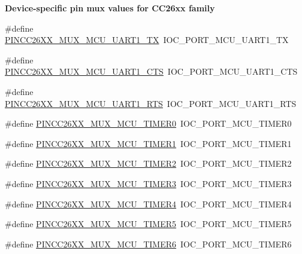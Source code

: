 \begin{Indent}{\bf Device-\/specific pin mux values for C\-C26xx family}
\begin{DoxyCompactItemize}
\item 
\#define \hyperlink{_p_i_n_c_c26_x_x_8h_a86f90a7c527db111500f481c32503c0e}{P\-I\-N\-C\-C26\-X\-X\-\_\-\-M\-U\-X\-\_\-\-M\-C\-U\-\_\-\-U\-A\-R\-T1\-\_\-\-T\-X}~I\-O\-C\-\_\-\-P\-O\-R\-T\-\_\-\-M\-C\-U\-\_\-\-U\-A\-R\-T1\-\_\-\-T\-X
\item 
\#define \hyperlink{_p_i_n_c_c26_x_x_8h_a7e579ca0aee2428813b15c97ba23d28b}{P\-I\-N\-C\-C26\-X\-X\-\_\-\-M\-U\-X\-\_\-\-M\-C\-U\-\_\-\-U\-A\-R\-T1\-\_\-\-C\-T\-S}~I\-O\-C\-\_\-\-P\-O\-R\-T\-\_\-\-M\-C\-U\-\_\-\-U\-A\-R\-T1\-\_\-\-C\-T\-S
\item 
\#define \hyperlink{_p_i_n_c_c26_x_x_8h_a19de716646ff8365a45a1111c5d41979}{P\-I\-N\-C\-C26\-X\-X\-\_\-\-M\-U\-X\-\_\-\-M\-C\-U\-\_\-\-U\-A\-R\-T1\-\_\-\-R\-T\-S}~I\-O\-C\-\_\-\-P\-O\-R\-T\-\_\-\-M\-C\-U\-\_\-\-U\-A\-R\-T1\-\_\-\-R\-T\-S
\item 
\#define \hyperlink{_p_i_n_c_c26_x_x_8h_ab6adbeb3876713207934393f6e3ea98b}{P\-I\-N\-C\-C26\-X\-X\-\_\-\-M\-U\-X\-\_\-\-M\-C\-U\-\_\-\-T\-I\-M\-E\-R0}~I\-O\-C\-\_\-\-P\-O\-R\-T\-\_\-\-M\-C\-U\-\_\-\-T\-I\-M\-E\-R0
\item 
\#define \hyperlink{_p_i_n_c_c26_x_x_8h_a3920a9c6a9d4e7111672d9db47dd2f0f}{P\-I\-N\-C\-C26\-X\-X\-\_\-\-M\-U\-X\-\_\-\-M\-C\-U\-\_\-\-T\-I\-M\-E\-R1}~I\-O\-C\-\_\-\-P\-O\-R\-T\-\_\-\-M\-C\-U\-\_\-\-T\-I\-M\-E\-R1
\item 
\#define \hyperlink{_p_i_n_c_c26_x_x_8h_a0f58eb941ff925a8b03cd2bb482471eb}{P\-I\-N\-C\-C26\-X\-X\-\_\-\-M\-U\-X\-\_\-\-M\-C\-U\-\_\-\-T\-I\-M\-E\-R2}~I\-O\-C\-\_\-\-P\-O\-R\-T\-\_\-\-M\-C\-U\-\_\-\-T\-I\-M\-E\-R2
\item 
\#define \hyperlink{_p_i_n_c_c26_x_x_8h_aae7f9981ad149939a03138af56f6f65f}{P\-I\-N\-C\-C26\-X\-X\-\_\-\-M\-U\-X\-\_\-\-M\-C\-U\-\_\-\-T\-I\-M\-E\-R3}~I\-O\-C\-\_\-\-P\-O\-R\-T\-\_\-\-M\-C\-U\-\_\-\-T\-I\-M\-E\-R3
\item 
\#define \hyperlink{_p_i_n_c_c26_x_x_8h_abe7dc70b7e11903c65cd712f0d7f9c06}{P\-I\-N\-C\-C26\-X\-X\-\_\-\-M\-U\-X\-\_\-\-M\-C\-U\-\_\-\-T\-I\-M\-E\-R4}~I\-O\-C\-\_\-\-P\-O\-R\-T\-\_\-\-M\-C\-U\-\_\-\-T\-I\-M\-E\-R4
\item 
\#define \hyperlink{_p_i_n_c_c26_x_x_8h_a1dfa83441369f987a042dd2e5b9b5bca}{P\-I\-N\-C\-C26\-X\-X\-\_\-\-M\-U\-X\-\_\-\-M\-C\-U\-\_\-\-T\-I\-M\-E\-R5}~I\-O\-C\-\_\-\-P\-O\-R\-T\-\_\-\-M\-C\-U\-\_\-\-T\-I\-M\-E\-R5
\item 
\#define \hyperlink{_p_i_n_c_c26_x_x_8h_a919f7a43fa29974e94f356c3ef0cb3a2}{P\-I\-N\-C\-C26\-X\-X\-\_\-\-M\-U\-X\-\_\-\-M\-C\-U\-\_\-\-T\-I\-M\-E\-R6}~I\-O\-C\-\_\-\-P\-O\-R\-T\-\_\-\-M\-C\-U\-\_\-\-T\-I\-M\-E\-R6

\end{DoxyCompactItemize}
\end{Indent}
